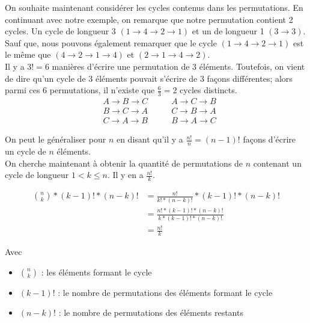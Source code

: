 	On souhaite maintenant considérer les cycles contenus dans les permutations.
	En continuant avec notre exemple, on remarque que notre permutation contient 2 cycles.
	Un cycle de longueur 3 $(1 \rightarrow 4 \rightarrow 2 \rightarrow 1)$ et un de longueur 1 $(3 \rightarrow 3)$.
	Sauf que, nous pouvons également remarquer que le cycle $(1 \rightarrow 4 \rightarrow 2 \rightarrow 1)$ est le même que $(4 \rightarrow 2 \rightarrow 1 \rightarrow 4)$ et $(2 \rightarrow 1 \rightarrow 4 \rightarrow 2)$. \\
	Il y a $3! = 6$ manières d'écrire une permutation de 3 éléments.
	Toutefois, on vient de dire qu'un cycle de 3 éléments pouvait s'écrire de 3 façons différentes; alors parmi ces $6$ permutations, il n'existe que $\frac{6}{3} = 2$ cycles distincts.
	\begin{align*}
		& A \rightarrow B \rightarrow C \qquad & A \rightarrow C \rightarrow B \\
		& B \rightarrow C \rightarrow A \qquad & C \rightarrow B \rightarrow A \\
		& C \rightarrow A \rightarrow B \qquad & B \rightarrow A \rightarrow C
	\end{align*}

	On peut le généraliser pour $n$ en disant qu'il y a $\frac{n!}{n} = (n-1)!$ façons d'écrire un cycle de $n$ éléments. \\

	On cherche maintenant à obtenir la quantité de permutations de $n$ contenant un cycle de longueur $ 1 < k \leq n$.
	Il y en a $\frac{n!}{k}$.

	\begin{align*}
		\binom{n}{k} * (k - 1)! * (n - k)! & = \frac{n!}{k! * (n - k)!} * (k - 1)! * (n - k)!           \\
		                                   & = \frac{n! * (k - 1)! * (n - k)!}{k * (k - 1)! * (n - k)!} \\
		                                   & = \frac{n!}{k}
	\end{align*}

	Avec
	\begin{itemize}
		\item $\binom{n}{k}$ : les éléments formant le cycle
		\item $(k - 1)!$ : le nombre de permutations des éléments formant le cycle
		\item $(n - k)!$ : le nombre de permutations des éléments restants
	\end{itemize}

